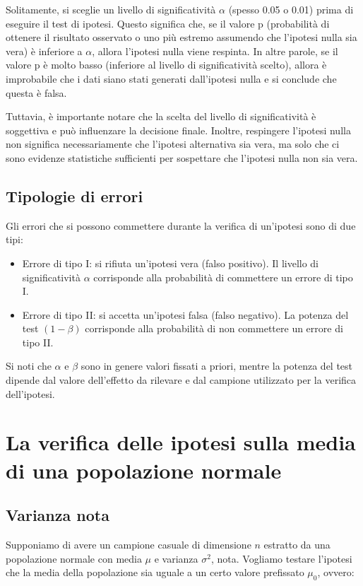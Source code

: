 Solitamente, si sceglie un livello di significatività $\alpha$ (spesso 0.05 o 0.01) prima di eseguire il test di ipotesi. Questo significa che, se il valore p (probabilità di ottenere il risultato osservato o uno più estremo assumendo che l'ipotesi nulla sia vera) è inferiore a $\alpha$, allora l'ipotesi nulla viene respinta. In altre parole, se il valore p è molto basso (inferiore al livello di significatività scelto), allora è improbabile che i dati siano stati generati dall'ipotesi nulla e si conclude che questa è falsa.

Tuttavia, è importante notare che la scelta del livello di significatività è soggettiva e può influenzare la decisione finale. Inoltre, respingere l'ipotesi nulla non significa necessariamente che l'ipotesi alternativa sia vera, ma solo che ci sono evidenze statistiche sufficienti per sospettare che l'ipotesi nulla non sia vera.


\subsection{Tipologie di errori}
Gli errori che si possono commettere durante la verifica di un'ipotesi sono di due tipi:

\begin{itemize}
    \item Errore di tipo I: si rifiuta un'ipotesi vera (falso positivo). Il livello di significatività $\alpha$ corrisponde alla probabilità di commettere un errore di tipo I.
    \item Errore di tipo II: si accetta un'ipotesi falsa (falso negativo). La potenza del test $(1-\beta)$ corrisponde alla probabilità di non commettere un errore di tipo II.
\end{itemize}

Si noti che $\alpha$ e $\beta$ sono in genere valori fissati a priori, mentre la potenza del test dipende dal valore dell'effetto da rilevare e dal campione utilizzato per la verifica dell'ipotesi.

\section{La verifica delle ipotesi sulla media di una popolazione normale}
\subsection{Varianza nota}

Supponiamo di avere un campione casuale di dimensione $n$ estratto da una popolazione normale con media $\mu$ e varianza $\sigma^2$, nota. Vogliamo testare l'ipotesi che la media della popolazione sia uguale a un certo valore prefissato $ \mu_0 $, ovvero:

